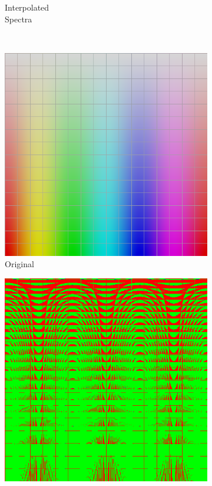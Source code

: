 \begin{figure}[t]
\begin{subfigure}[t]{0.22\textwidth}
		\caption{Interpolated\\Spectra}
		\label{fig:sigUpliftInterpSpectra}
	\end{subfigure}
	\vspace{0.5em}\\
	\begin{subfigure}[t]{0.22\textwidth}
		\includegraphics[width=\linewidth]{img/uplifting_texture_original.png}
		\caption{Original\\ }
		\label{fig:sigUpliftOriginal}
	\end{subfigure} \hspace{0.05em}
	\begin{subfigure}[t]{0.22\textwidth}
		\includegraphics[width=\linewidth]{img/uplifting_diff_originalNeighbor.png}

\end{subfigure}
\end{figure}
